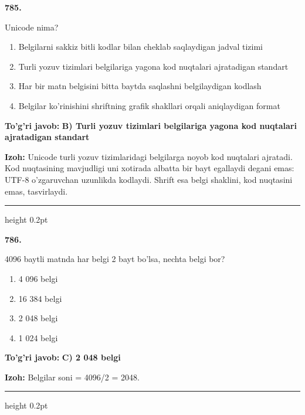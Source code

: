 \documentclass[10pt,a4paper,oneside]{article}
\begin{document}
\noindent\textbf{\color{ink}785.}
\par
Unicode nima?
\begin{enumerate}[label=\Alph*),leftmargin=9mm]
\item Belgilarni sakkiz bitli kodlar bilan cheklab saqlaydigan jadval tizimi
\item Turli yozuv tizimlari belgilariga yagona kod nuqtalari ajratadigan standart
\item Har bir matn belgisini bitta baytda saqlashni belgilaydigan kodlash
\item Belgilar ko'rinishini shriftning grafik shakllari orqali aniqlaydigan format
\end{enumerate}
\begin{tcolorbox}[enhanced,breakable,colback=teal!4,colframe=teal!50!black,boxrule=0.5pt,arc=1.1mm,left=3mm,right=3mm,top=1.7mm,bottom=1.7mm,before skip=2mm,after skip=2mm]
\textbf{\color{teal}To'g'ri javob:} \textbf{B) Turli yozuv tizimlari belgilariga yagona kod nuqtalari ajratadigan standart}
\par\smallskip
\textbf{Izoh:} Unicode turli yozuv tizimlaridagi belgilarga noyob kod nuqtalari ajratadi. Kod nuqtasining mavjudligi uni xotirada albatta bir bayt egallaydi degani emas: UTF-8 o'zgaruvchan uzunlikda kodlaydi. Shrift esa belgi shaklini, kod nuqtasini emas, tasvirlaydi.
\end{tcolorbox}
\vspace{2mm}\hrule height 0.2pt \vspace{3mm}

\noindent\textbf{\color{ink}786.}
\par
4096 baytli matnda har belgi 2 bayt bo'lsa, nechta belgi bor?
\begin{enumerate}[label=\Alph*),leftmargin=9mm]
\item 4 096 belgi
\item 16 384 belgi
\item 2 048 belgi
\item 1 024 belgi
\end{enumerate}
\begin{tcolorbox}[enhanced,breakable,colback=teal!4,colframe=teal!50!black,boxrule=0.5pt,arc=1.1mm,left=3mm,right=3mm,top=1.7mm,bottom=1.7mm,before skip=2mm,after skip=2mm]
\textbf{\color{teal}To'g'ri javob:} \textbf{C) 2 048 belgi}
\par\smallskip
\textbf{Izoh:} Belgilar soni = 4096/2 = 2048.
\end{tcolorbox}
\vspace{2mm}\hrule height 0.2pt \vspace{3mm}
\end{document}
